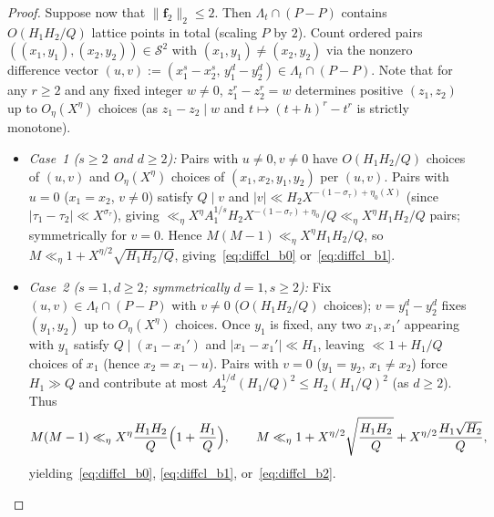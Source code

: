 \documentclass[11pt,a4paper]{amsart}
\theoremstyle{plain}
\theoremstyle{definition}
\theoremstyle{remark}
\begin{document}
\begin{proof}
Suppose now that $\|\mathbf{f}_2\|_2 \le 2$. Then $\Lambda_t \cap (P - P)$ contains $O(H_1 H_2 / Q)$ lattice points in total (scaling $P$ by $2$). Count ordered pairs $((x_1,y_1),(x_2,y_2)) \in \mathcal{S}^2$ with $(x_1,y_1) \neq (x_2,y_2)$ via the nonzero difference vector $(u, v) := (x_1^s - x_2^s,\, y_1^d - y_2^d) \in \Lambda_t \cap (P - P)$. Note that for any $r \ge 2$ and any fixed integer $w \neq 0$, $z_1^r - z_2^r = w$ determines positive $(z_1, z_2)$ up to $O_\eta(X^\eta)$ choices (as $z_1 - z_2 \mid w$ and $t \mapsto (t+h)^r - t^r$ is strictly monotone).
\begin{itemize}[itemsep=2pt]
\item \emph{Case~1 ($s \ge 2$ and $d \ge 2$):} Pairs with $u \neq 0, v \neq 0$ have $O(H_1 H_2 / Q)$ choices of $(u,v)$ and $O_\eta(X^\eta)$ choices of $(x_1,x_2,y_1,y_2)$ per $(u,v)$. Pairs with $u = 0$ ($x_1 = x_2$, $v \neq 0$) satisfy $Q \mid v$ and $|v| \ll H_2 X^{-(1-\sigma_\tau)+\eta_0(X)}$ (since $|\tau_1 - \tau_2| \ll X^{\sigma_\tau}$), giving $\ll_\eta X^\eta A_1^{1/s} H_2 X^{-(1-\sigma_\tau)+\eta_0}/Q \ll_\eta X^\eta H_1 H_2 / Q$ pairs; symmetrically for $v = 0$. Hence $M(M-1) \ll_\eta X^\eta H_1 H_2 / Q$, so $M \ll_\eta 1 + X^{\eta/2}\sqrt{H_1 H_2 / Q}$, giving~\eqref{eq:diffcl_b0} or~\eqref{eq:diffcl_b1}.
\item \emph{Case~2 ($s = 1, d \ge 2$; symmetrically $d = 1, s \ge 2$):} Fix $(u, v) \in \Lambda_t \cap (P - P)$ with $v \neq 0$ ($O(H_1 H_2 / Q)$ choices); $v = y_1^d - y_2^d$ fixes $(y_1, y_2)$ up to $O_\eta(X^\eta)$ choices. Once $y_1$ is fixed, any two $x_1, x_1'$ appearing with $y_1$ satisfy $Q \mid (x_1 - x_1')$ and $|x_1 - x_1'| \ll H_1$, leaving $\ll 1 + H_1/Q$ choices of $x_1$ (hence $x_2 = x_1 - u$). Pairs with $v = 0$ ($y_1 = y_2$, $x_1 \neq x_2$) force $H_1 \gg Q$ and contribute at most $A_2^{1/d} (H_1 / Q)^2 \le H_2 (H_1 / Q)^2$ (as $d \ge 2$). Thus
\[
  M(M-1) \ll_\eta X^\eta \frac{H_1 H_2}{Q}\Bigl(1 + \frac{H_1}{Q}\Bigr), \qquad
  M \ll_\eta 1 + X^{\eta/2}\sqrt{\frac{H_1 H_2}{Q}} + X^{\eta/2}\frac{H_1 \sqrt{H_2}}{Q},
\]
yielding~\eqref{eq:diffcl_b0}, \eqref{eq:diffcl_b1}, or~\eqref{eq:diffcl_b2}. \qedhere
\end{itemize}
\end{proof}
\end{document}
